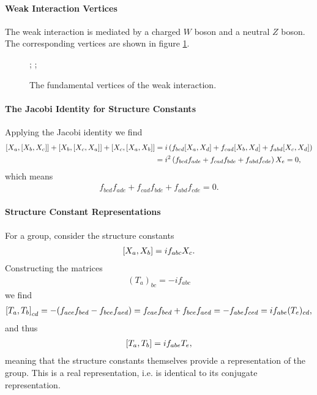 \paragraph{Weak Interaction Vertices}
The weak interaction is mediated by a charged $W$ boson and a neutral $Z$ boson. The corresponding vertices are shown in figure \ref{fig:weak_verts}.

\begin{figure}[!ht]
	\centering
	;
	;
	\caption{The fundamental vertices of the weak interaction.}
	\label{fig:weak_verts}
\end{figure}

\paragraph{The Jacobi Identity for Structure Constants}
Applying the Jacobi identity we find
\begin{align*}
	\comm{X_{a}}{\comm{X_{b}}{X_{c}}} + \comm{X_{b}}{\comm{X_{c}}{X_{a}}} + \comm{X_{c}}{\comm{X_{a}}{X_{b}}} &= i\left(f_{bcd}\comm{X_{a}}{X_{d}} + f_{cad}\comm{X_{b}}{X_{d}} + f_{abd}\comm{X_{c}}{X_{d}}\right) \\
	                                  &= i^{2}\left(f_{bcd}f_{ade} + f_{cad}f_{bde} + f_{abd}f_{cde}\right)X_{e} = 0,
\end{align*}
which means
\begin{align*}
	f_{bcd}f_{ade} + f_{cad}f_{bde} + f_{abd}f_{cde} = 0.
\end{align*}

\paragraph{Structure Constant Representations}
For a group, consider the structure constants
\begin{align*}
	\comm{X_{a}}{X_{b}} = if_{abc}X_{c}.
\end{align*}
Constructing the matrices
\begin{align*}
	(T_{a})_{bc} = -if_{abc}
\end{align*}
we find
\begin{align*}
	\comm{T_{a}}{T_{b}}_{cd} = -(f_{ace}f_{bed} - f_{bce}f_{aed}) = f_{cae}f_{bed} + f_{bce}f_{aed} = -f_{abe}f_{ced} = if_{abe}(T_{e})_{cd},
\end{align*}
and thus
\begin{align*}
	\comm{T_{a}}{T_{b}} = if_{abe}T_{e},
\end{align*}
meaning that the structure constants themselves provide a representation of the group. This is a real representation, i.e. is identical to its conjugate representation.

